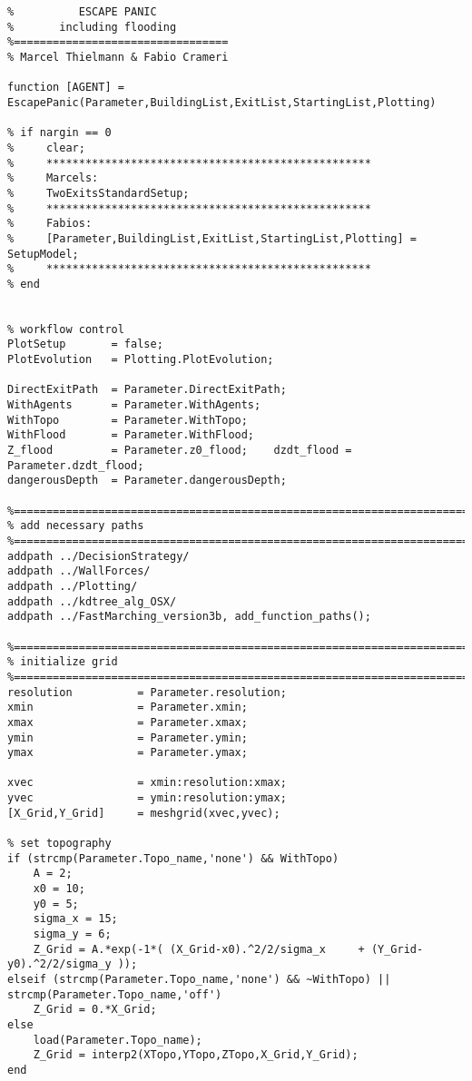 
\lstset{basicstyle=\footnotesize\ttfamily}
    
    \begin{lstlisting}[breaklines]
%=================================
%          ESCAPE PANIC
%       including flooding
%=================================
% Marcel Thielmann & Fabio Crameri

function [AGENT] = EscapePanic(Parameter,BuildingList,ExitList,StartingList,Plotting)

% if nargin == 0
%     clear;
%     **************************************************
%     Marcels:
%     TwoExitsStandardSetup;
%     **************************************************
%     Fabios:
%     [Parameter,BuildingList,ExitList,StartingList,Plotting] = SetupModel;
%     **************************************************
% end


% workflow control
PlotSetup       = false;
PlotEvolution   = Plotting.PlotEvolution;

DirectExitPath  = Parameter.DirectExitPath;
WithAgents      = Parameter.WithAgents;
WithTopo        = Parameter.WithTopo;
WithFlood       = Parameter.WithFlood;
Z_flood         = Parameter.z0_flood;    dzdt_flood = Parameter.dzdt_flood;
dangerousDepth  = Parameter.dangerousDepth;

%==========================================================================
% add necessary paths
%==========================================================================
addpath ../DecisionStrategy/
addpath ../WallForces/
addpath ../Plotting/
addpath ../kdtree_alg_OSX/
addpath ../FastMarching_version3b, add_function_paths();

%==========================================================================
% initialize grid
%==========================================================================
resolution          = Parameter.resolution;
xmin                = Parameter.xmin;
xmax                = Parameter.xmax;
ymin                = Parameter.ymin;
ymax                = Parameter.ymax;

xvec                = xmin:resolution:xmax;
yvec                = ymin:resolution:ymax;
[X_Grid,Y_Grid]     = meshgrid(xvec,yvec);

% set topography
if (strcmp(Parameter.Topo_name,'none') && WithTopo)
    A = 2;
    x0 = 10;
    y0 = 5;
    sigma_x = 15;
    sigma_y = 6;
    Z_Grid = A.*exp(-1*( (X_Grid-x0).^2/2/sigma_x     + (Y_Grid-y0).^2/2/sigma_y ));
elseif (strcmp(Parameter.Topo_name,'none') && ~WithTopo) || strcmp(Parameter.Topo_name,'off')
    Z_Grid = 0.*X_Grid;
else
    load(Parameter.Topo_name);
    Z_Grid = interp2(XTopo,YTopo,ZTopo,X_Grid,Y_Grid);
end


\end{lstlisting}
